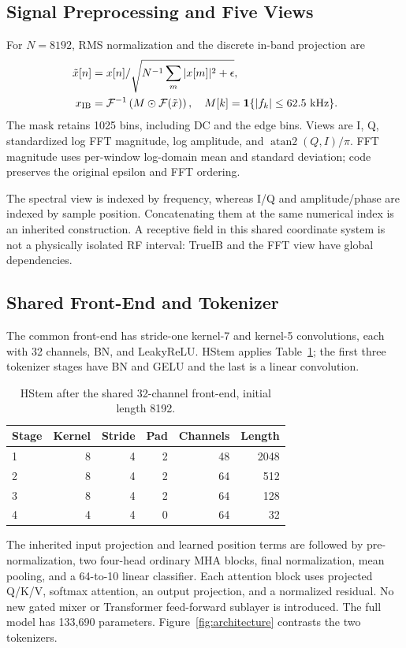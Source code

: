 \documentclass[journal]{IEEEtran}
\begin{document}
\subsection{Signal Preprocessing and Five Views}
For $N=8192$, RMS normalization and the discrete in-band projection are
\begin{align}
 \tilde{x}[n]&=x[n]/\sqrt{N^{-1}\sum_m|x[m]|^2+\epsilon},\\
 x_{\mathrm{IB}}&=\mathcal{F}^{-1}
      \left(M\odot\mathcal{F}(\tilde{x})\right),\quad
 M[k]=\mathbf{1}\{|f_k|\leq 62.5\ {\rm kHz}\}.
\end{align}
The mask retains 1025 bins, including DC and the edge bins. Views are I, Q, standardized log FFT magnitude, log amplitude, and $\operatorname{atan 2}(Q,I)/\pi$. FFT magnitude uses per-window log-domain mean and standard deviation; code preserves the original epsilon and FFT ordering.

The spectral view is indexed by frequency, whereas I/Q and amplitude/phase are indexed by sample position. Concatenating them at the same numerical index is an inherited construction. A receptive field in this shared coordinate system is not a physically isolated RF interval: TrueIB and the FFT view have global dependencies.

\subsection{Shared Front-End and Tokenizer}
The common front-end has stride-one kernel-7 and kernel-5 convolutions, each with 32 channels, BN, and LeakyReLU. HStem applies Table~\ref{tab:arch}; the first three tokenizer stages have BN and GELU and the last is a linear convolution.

\begin{table}[t]\centering
\caption{HStem after the shared 32-channel front-end, initial length 8192.}
\label{tab:arch}
\begin{tabular}{lrrrrr}\toprule
Stage & Kernel & Stride & Pad & Channels & Length\\\midrule
1 & 8 & 4 & 2 & 48 & 2048\\
2 & 8 & 4 & 2 & 64 & 512\\
3 & 8 & 4 & 2 & 64 & 128\\
4 & 4 & 4 & 0 & 64 & 32\\\bottomrule
\end{tabular}
\end{table}

The inherited input projection and learned position terms are followed by pre-normalization, two four-head ordinary MHA blocks, final normalization, mean pooling, and a 64-to-10 linear classifier. Each attention block uses projected Q/K/V, softmax attention, an output projection, and a normalized residual. No new gated mixer or Transformer feed-forward sublayer is introduced. The full model has 133,690 parameters. Figure~\ref{fig:architecture} contrasts the two tokenizers.
\end{document}
